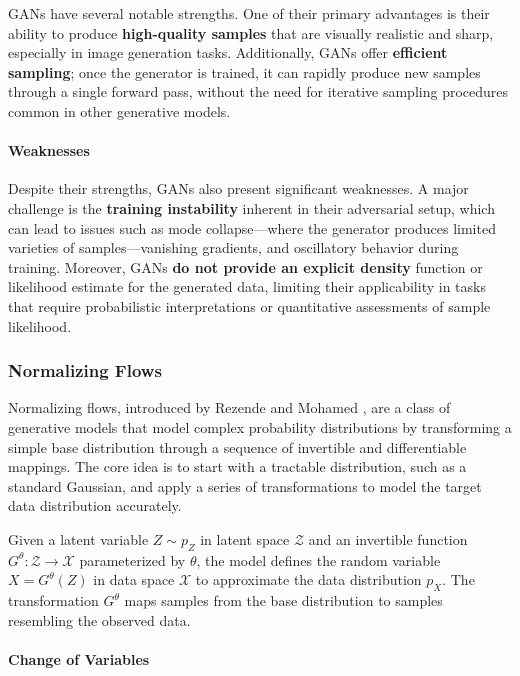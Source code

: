 GANs have several notable strengths. One of their primary advantages is their ability to produce \textbf{high-quality samples} that are visually realistic and sharp, especially in image generation tasks. Additionally, GANs offer \textbf{efficient sampling}; once the generator is trained, it can rapidly produce new samples through a single forward pass, without the need for iterative sampling procedures common in other generative models.

\paragraph{Weaknesses}

Despite their strengths, GANs also present significant weaknesses. A major challenge is the \textbf{training instability} inherent in their adversarial setup, which can lead to issues such as mode collapse—where the generator produces limited varieties of samples—vanishing gradients, and oscillatory behavior during training. Moreover, GANs \textbf{do not provide an explicit density} function or likelihood estimate for the generated data, limiting their applicability in tasks that require probabilistic interpretations or quantitative assessments of sample likelihood.

\subsubsection{Normalizing Flows}\label{sec:normalizing_flows}

Normalizing flows, introduced by Rezende and Mohamed \cite{rezende2015variational}, are a class of generative models that model complex probability distributions by transforming a simple base distribution through a sequence of invertible and differentiable mappings. The core idea is to start with a tractable distribution, such as a standard Gaussian, and apply a series of transformations to model the target data distribution accurately.

Given a latent variable $Z \sim p_Z$ in latent space $\mathcal{Z}$ and an invertible function $G^\theta: \mathcal{Z} \rightarrow \mathcal{X}$ parameterized by $\theta$, the model defines the random variable $X = G^\theta(Z)$ in data space $\mathcal{X}$ to approximate the data distribution $p_X$. The transformation $G^\theta$ maps samples from the base distribution to samples resembling the observed data.

\paragraph{Change of Variables}

